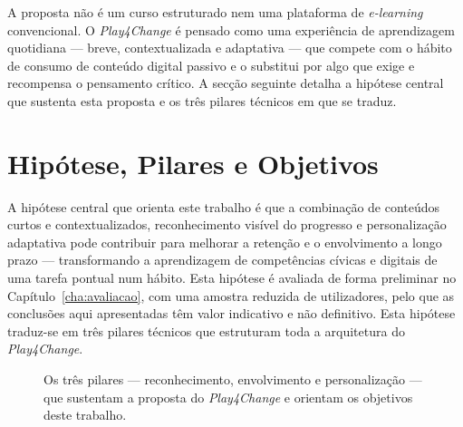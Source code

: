 A proposta não é um curso estruturado nem uma plataforma de \emph{e-learning} convencional. O \emph{Play4Change} é pensado como uma experiência de aprendizagem quotidiana --- breve, contextualizada e adaptativa --- que compete com o hábito de consumo de conteúdo digital passivo e o substitui por algo que exige e recompensa o pensamento crítico. A secção seguinte detalha a hipótese central que sustenta esta proposta e os três pilares técnicos em que se traduz.

\section{Hipótese, Pilares e Objetivos}
\label{sec:objetivos-pilares}

A hipótese central que orienta este trabalho é que a combinação de conteúdos curtos e contextualizados, reconhecimento visível do progresso e personalização adaptativa pode contribuir para melhorar a retenção e o envolvimento a longo prazo --- transformando a aprendizagem de competências cívicas e digitais de uma tarefa pontual num hábito. Esta hipótese é avaliada de forma preliminar no Capítulo~\ref{cha:avaliacao}, com uma amostra reduzida de utilizadores, pelo que as conclusões aqui apresentadas têm valor indicativo e não definitivo. Esta hipótese traduz-se em três pilares técnicos que estruturam toda a arquitetura do \emph{Play4Change}.

\begin{figure}[htbp]
	\centering
	\caption[Os três pilares do Play4Change]{Os três pilares --- reconhecimento, envolvimento e personalização --- que sustentam a proposta do \emph{Play4Change} e orientam os objetivos deste trabalho.}
	\label{fig:tres-pilares}
\end{figure}

